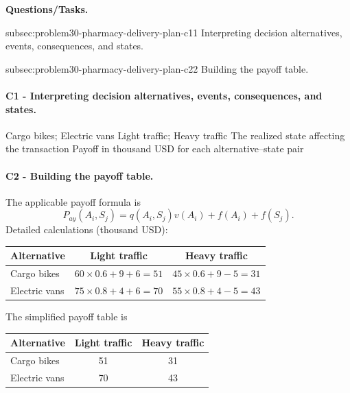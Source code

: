 	\textbf{Questions/Tasks.}
	\begin{enumerate}
	\CriterionTask
	{subsec:problem30-pharmacy-delivery-plan-c1}{1}
	{Interpreting decision alternatives, events, consequences, and states.}

	\CriterionTask
	{subsec:problem30-pharmacy-delivery-plan-c2}{2}
	{Building the payoff table.}
	\end{enumerate}

	\paragraph*{C1 - Interpreting decision alternatives, events, consequences, and states.}
	\label{subsec:problem30-pharmacy-delivery-plan-c1}
	\DecisionElementsTable
	{Cargo bikes; Electric vans}
	{Light traffic; Heavy traffic}
	{The realized state affecting the transaction}
	{Payoff in thousand USD for each alternative--state pair}

	\paragraph*{C2 - Building the payoff table.}
	\label{subsec:problem30-pharmacy-delivery-plan-c2}
	The applicable payoff formula is
	\[ P_{ay}(A_i,S_j)=q(A_i,S_j)v(A_i)+f(A_i)+f(S_j). \]
	Detailed calculations (thousand USD):
	\begin{center}\small
	\begin{tabular}{lcc}
	\toprule
	Alternative & Light traffic & Heavy traffic \\
	\midrule
	Cargo bikes & $60\times 0.6+9+6=51$ & $45\times 0.6+9-5=31$ \\
Electric vans & $75\times 0.8+4+6=70$ & $55\times 0.8+4-5=43$ \\
	\bottomrule
	\end{tabular}
	\end{center}
	The simplified payoff table is
	\begin{center}
	\begin{tabular}{lcc}
	\toprule
	Alternative & Light traffic & Heavy traffic \\
	\midrule
	Cargo bikes & 51 & 31 \\
Electric vans & 70 & 43 \\
	\bottomrule
	\end{tabular}
	\end{center}

